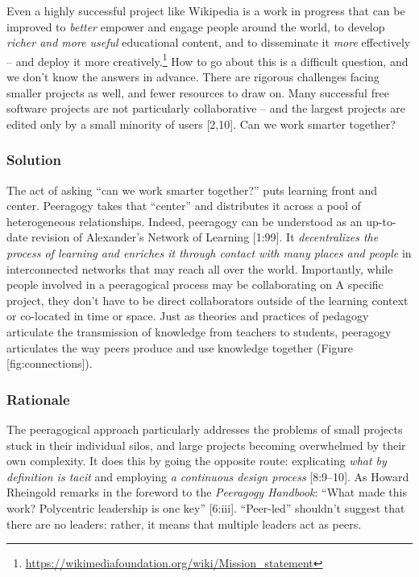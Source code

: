 Even a highly successful project like Wikipedia is a work in progress
that can be improved to \emph{better} empower and engage people around
the world, to develop \emph{richer and more useful} educational content,
and to disseminate it \emph{more} effectively -- and deploy it more
creatively.\footnote{\url{https://wikimediafoundation.org/wiki/Mission_statement}}
How to go about this is a difficult question, and we don't know the
answers in advance. There are rigorous challenges facing smaller
projects as well, and fewer resources to draw on. Many successful free
software projects are not particularly collaborative -- and the largest
projects are edited only by a small minority of users {{[}2,10{]}}. Can
we work smarter together?

\hypertarget{solution}{%
\subsubsection{Solution}\label{solution}}

The act of asking ``can we work smarter together?'' puts learning front
and center. Peeragogy takes that ``center'' and distributes it across a
pool of heterogeneous relationships. Indeed, peeragogy can be understood
as an up-to-date revision of Alexander's {{Network of Learning}}
{{[}1:99{]}}. It \emph{decentralizes the process of learning and
enriches it through contact with many places and people} in
interconnected networks that may reach all over the world. Importantly,
while people involved in a peeragogical process may be collaborating on
{{A specific project}}, they don't have to be direct collaborators
outside of the learning context or co-located in time or space. Just as
theories and practices of pedagogy articulate the transmission of
knowledge from teachers to students, peeragogy articulates the way peers
produce and use knowledge together (Figure {[}fig:connections{]}).

\hypertarget{rationale}{%
\subsubsection{Rationale}\label{rationale}}

The peeragogical approach particularly addresses the problems of small
projects stuck in their individual silos, and large projects becoming
overwhelmed by their own complexity. It does this by going the opposite
route: explicating \emph{what by definition is tacit} and employing
\emph{a continuous design process} {{[}8:9--10{]}}. As Howard Rheingold
remarks in the foreword to the \emph{Peeragogy Handbook}: ``What made
this work? Polycentric leadership is one key'' {{[}6:iii{]}}.
``Peer-led'' shouldn't suggest that there are no leaders: rather, it
means that multiple leaders act as peers.

